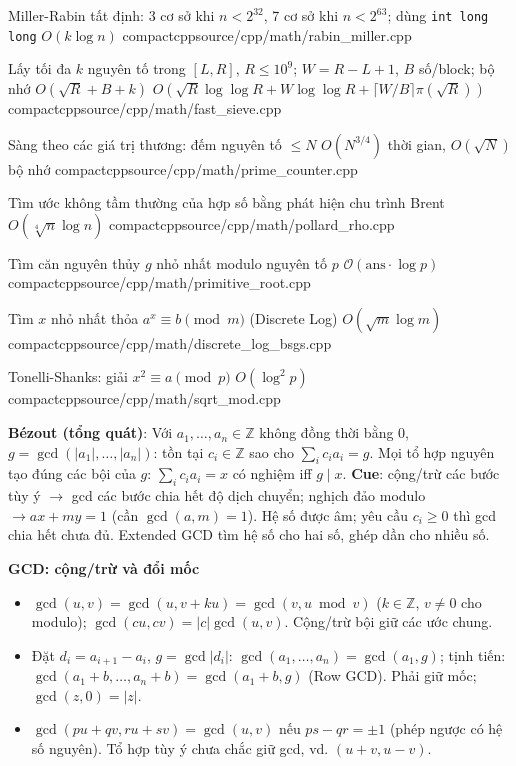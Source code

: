 {Miller-Rabin tất định: 3 cơ sở khi $n<2^{32}$, 7 cơ sở khi $n<2^{63}$; dùng \texttt{int long long}}
{${O}(k \log n)$}
{compactcpp}{source/cpp/math/rabin_miller.cpp}

{Lấy tối đa $k$ nguyên tố trong $[L,R]$, $R\le10^9$; $W=R-L+1$, $B$ số/block; bộ nhớ $O(\sqrt R+B+k)$}
{$O(\sqrt R\log\log R+W\log\log R+\lceil W/B\rceil\pi(\sqrt R))$}
{compactcpp}{source/cpp/math/fast_sieve.cpp}

{Sàng theo các giá trị thương: đếm nguyên tố $\le N$}
{$O(N^{3/4})$ thời gian, $O(\sqrt N)$ bộ nhớ}
{compactcpp}{source/cpp/math/prime_counter.cpp}

{Tìm ước không tầm thường của hợp số bằng phát hiện chu trình Brent}
{$O(\sqrt[4]{n} \log n)$}
{compactcpp}{source/cpp/math/pollard_rho.cpp}

{Tìm căn nguyên thủy $g$ nhỏ nhất modulo nguyên tố $p$}
{$\mathcal{O}(\text{ans} \cdot \log p)$}
{compactcpp}{source/cpp/math/primitive_root.cpp}

{Tìm $x$ nhỏ nhất thỏa $a^x \equiv b \pmod m$ (Discrete Log)}
{$O(\sqrt{m} \log m)$}
{compactcpp}{source/cpp/math/discrete_log_bsgs.cpp}

{Tonelli-Shanks: giải $x^2 \equiv a \pmod p$}
{$O(\log^2 p)$}
{compactcpp}{source/cpp/math/sqrt_mod.cpp}

\noindent\textbf{Bézout (tổng quát)}: Với $a_1,\ldots,a_n\in\mathbb Z$ không đồng thời bằng 0, $g=\gcd(|a_1|,\ldots,|a_n|)$: tồn tại $c_i\in\mathbb Z$ sao cho $\sum_i c_i a_i=g$. Mọi tổ hợp nguyên tạo đúng các bội của $g$: $\sum_i c_i a_i=x$ có nghiệm iff $g\mid x$. \textbf{Cue}: cộng/trừ các bước tùy ý $\to$ gcd các bước chia hết độ dịch chuyển; nghịch đảo modulo $\to ax+my=1$ (cần $\gcd(a,m)=1$). Hệ số được âm; yêu cầu $c_i\ge0$ thì gcd chia hết chưa đủ. Extended GCD tìm hệ số cho hai số, ghép dần cho nhiều số.

\noindent\textbf{GCD: cộng/trừ và đổi mốc}
\begin{itemize}
    \setlength{\itemsep}{1pt}
    \setlength{\parsep}{0pt}
    \item $\gcd(u,v)=\gcd(u,v+ku)=\gcd(v,u\bmod v)$ ($k\in\mathbb Z$, $v\ne0$ cho modulo); $\gcd(cu,cv)=|c|\gcd(u,v)$. Cộng/trừ bội giữ các ước chung.
    \item Đặt $d_i=a_{i+1}-a_i$, $g=\gcd|d_i|$: $\gcd(a_1,\ldots,a_n)=\gcd(a_1,g)$; tịnh tiến: $\gcd(a_1+b,\ldots,a_n+b)=\gcd(a_1+b,g)$ (Row GCD). Phải giữ mốc; $\gcd(z,0)=|z|$.
    \item $\gcd(pu+qv,ru+sv)=\gcd(u,v)$ nếu $ps-qr=\pm1$ (phép ngược có hệ số nguyên). Tổ hợp tùy ý chưa chắc giữ gcd, vd. $(u+v,u-v)$.
\end{itemize}

